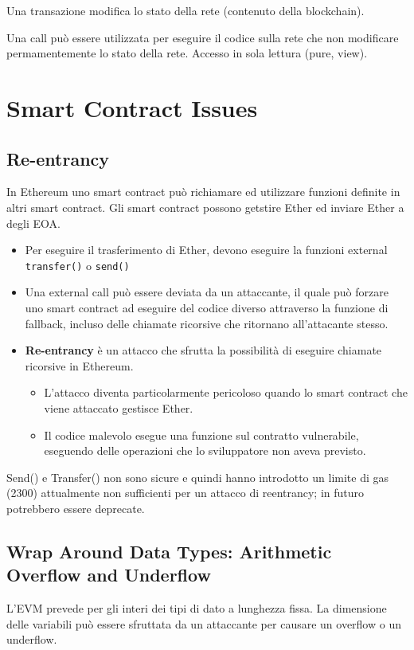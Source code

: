 \documentclass[a4paper]{article}
\begin{document}
\begin{definition}
    Una transazione modifica lo stato della rete (contenuto della blockchain).
\end{definition}
\begin{definition}
    Una call può essere utilizzata per eseguire il codice sulla rete che non modificare permamentemente lo stato della rete. 
    Accesso in sola lettura (pure, view).
\end{definition}


\section{Smart Contract Issues}

\subsection{Re-entrancy}

In Ethereum uno smart contract può richiamare ed utilizzare funzioni definite in altri smart contract.
Gli smart contract possono getstire Ether ed inviare Ether a degli EOA.
\begin{itemize}
    \item Per eseguire il trasferimento di Ether, devono eseguire la funzioni external \texttt{transfer()} o \texttt{send()}
    \item Una external call può essere deviata da un attaccante, il quale può forzare uno smart contract ad eseguire del codice diverso attraverso la funzione di fallback, incluso delle chiamate ricorsive che ritornano all'attacante stesso.
    \item \textbf{Re-entrancy} è un attacco che sfrutta la possibilità di eseguire chiamate ricorsive in Ethereum.
    \begin{itemize}
        \item L'attacco diventa particolarmente pericoloso quando lo smart contract che viene attaccato gestisce Ether.
        \item Il codice malevolo esegue una funzione sul contratto vulnerabile, eseguendo delle operazioni che lo sviluppatore non aveva previsto. 
    \end{itemize}
\end{itemize}

Send() e Transfer() non sono sicure e quindi hanno introdotto un limite di gas (2300) attualmente non sufficienti per un attacco di reentrancy; in futuro potrebbero essere deprecate. 

\subsection{Wrap Around Data Types: Arithmetic Overflow and Underflow}

L'EVM prevede per gli interi dei tipi di dato a lunghezza fissa.
La dimensione delle variabili può essere sfruttata da un attaccante per causare un overflow o un underflow. 
\end{document}
